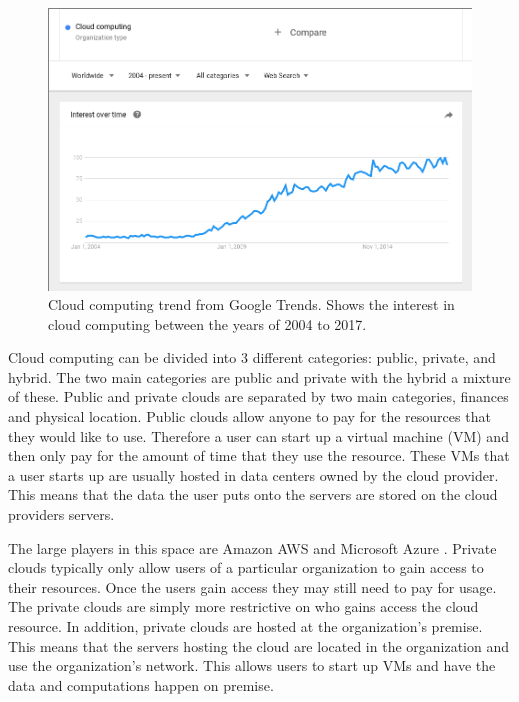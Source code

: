 \documentclass[12pt]{article}
\begin{document}
\begin{figure}[ht]
    \centering
    \includegraphics[scale=.3]{./pic/2017-06-14-130823_923x615_scrot.png}
    \caption{Cloud computing trend from Google Trends. Shows the interest in cloud computing between the years of 2004 to 2017. \cite{GoogleTrendsCloud}}
    \label{fig:CloudTrendGoogle}
\end{figure}

Cloud computing can be divided into 3 different categories: public, private, and hybrid.  The two main categories are public and private with the hybrid a mixture of these. Public and private clouds are separated by two main categories, finances and physical location. Public clouds allow anyone to pay for the resources that they would like to use. Therefore a user can start up a virtual machine (VM) and then only pay for the amount of time that they use the resource. These VMs that a user starts up are usually hosted in data centers owned by the cloud provider. This means that the data the user puts onto the servers are stored on the cloud providers servers.

The large players in this space are Amazon AWS \cite{amazonAWS} and Microsoft Azure \cite{Azure2017}. Private clouds typically only allow users of a particular organization to gain access to their resources. Once the users gain access they may still need to pay for usage. The private clouds are simply more restrictive on who gains access the cloud resource. In addition, private clouds are hosted at the organization's premise.  This means that the servers hosting the cloud are located in the organization and use the organization's network. This allows users to start up VMs and have the data and computations happen on premise.
\end{document}
